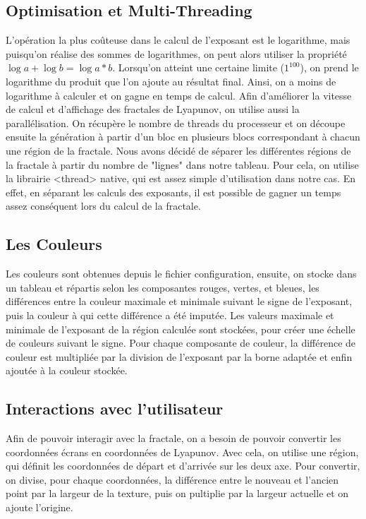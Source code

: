 \documentclass{article}
\begin{document}
	\subsection{Optimisation et Multi-Threading}

    L'opération la plus coûteuse dans le calcul de l'exposant est le logarithme, mais puisqu'on réalise des sommes de logarithmes, on peut alors utiliser la propriété $\log{a} + \log{b} = \log{a * b}$.
    Lorsqu'on atteint une certaine limite ($1^{100}$), on prend le logarithme du produit que l'on ajoute au résultat final.
    Ainsi, on a moins de logarithme à calculer et on gagne en temps de calcul.
	Afin d'améliorer la vitesse de calcul et d'affichage des fractales de Lyapunov, on utilise aussi la parallélisation.
    On récupère le nombre de threads du processeur et on découpe ensuite la génération à partir d'un bloc en plusieurs blocs correspondant à chacun une région de la fractale.
	Nous avons décidé de séparer les différentes régions de la fractale à partir du nombre de "lignes" dans notre tableau.
	Pour cela, on utilise la librairie <thread> native, qui est assez simple d'utilisation dans notre cas.
	En effet, en séparant les calculs des exposants, il est possible de gagner un temps assez conséquent lors du calcul de la fractale.

    \subsection{Les Couleurs}

    Les couleurs sont obtenues depuis le fichier configuration, ensuite, on stocke dans un tableau et répartis selon les composantes rouges, vertes, et bleues, les différences entre la couleur maximale et minimale suivant le signe de l'exposant, puis la couleur à qui cette différence a été imputée.
    Les valeurs maximale et minimale de l'exposant de la région calculée sont stockées, pour créer une échelle de couleurs suivant le signe.
    Pour chaque composante de couleur, la différence de couleur est multipliée par la division de l'exposant par la borne adaptée et enfin ajoutée à la couleur stockée.

    \subsection{Interactions avec l'utilisateur}

    Afin de pouvoir interagir avec la fractale, on a besoin de pouvoir convertir les coordonnées écrans en coordonnées de Lyapunov.
    Avec cela, on utilise une région, qui définit les coordonnées de départ et d'arrivée sur les deux axe.
    Pour convertir, on divise, pour chaque coordonnées, la différence entre le nouveau et l'ancien point par la largeur de la texture, puis on pultiplie par la largeur actuelle et on ajoute l'origine.
\end{document}
